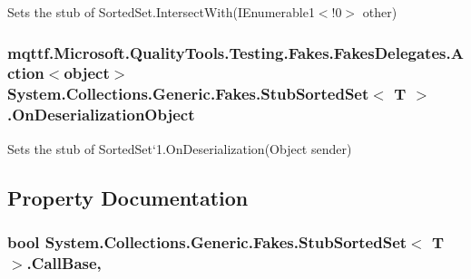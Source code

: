 Sets the stub of Sorted\-Set{.\-Intersect\-With(I\-Enumerable}1$<$!0$>$ other)

\hypertarget{class_system_1_1_collections_1_1_generic_1_1_fakes_1_1_stub_sorted_set_3_01_t_01_4_ae7a8ae2be822ebb9a150b60798ca637b}{
\subsubsection[{On\-Deserialization\-Object}]{\setlength{\rightskip}{0pt plus 5cm}mqttf.\-Microsoft.\-Quality\-Tools.\-Testing.\-Fakes.\-Fakes\-Delegates.\-Action$<$object$>$ System.\-Collections.\-Generic.\-Fakes.\-Stub\-Sorted\-Set$<$ T $>$.On\-Deserialization\-Object}}\label{class_system_1_1_collections_1_1_generic_1_1_fakes_1_1_stub_sorted_set_3_01_t_01_4_ae7a8ae2be822ebb9a150b60798ca637b}


Sets the stub of Sorted\-Set`1.On\-Deserialization(\-Object sender)



\subsection{Property Documentation}
\hypertarget{class_system_1_1_collections_1_1_generic_1_1_fakes_1_1_stub_sorted_set_3_01_t_01_4_a939dbc1a11da3e24cc64f5a51608824b}{
\subsubsection[{Call\-Base}]{\setlength{\rightskip}{0pt plus 5cm}bool System.\-Collections.\-Generic.\-Fakes.\-Stub\-Sorted\-Set$<$ T $>$.Call\-Base\hspace{0.3cm}{\ttfamily [get]}, {\ttfamily [set]}}}\label{class_system_1_1_collections_1_1_generic_1_1_fakes_1_1_stub_sorted_set_3_01_t_01_4_a939dbc1a11da3e24cc64f5a51608824b}


